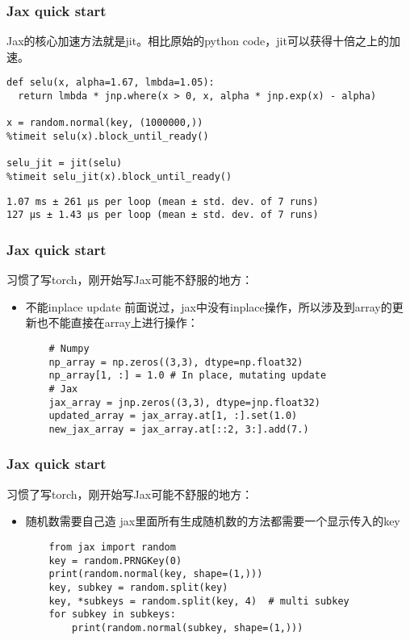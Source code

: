 \documentclass{beamer}
\begin{document}
\begin{frame}[fragile]
\frametitle{Jax quick start}

Jax的核心加速方法就是jit。相比原始的python code，jit可以获得十倍之上的加速。\newline
\begin{verbatim}
def selu(x, alpha=1.67, lmbda=1.05):
  return lmbda * jnp.where(x > 0, x, alpha * jnp.exp(x) - alpha)

x = random.normal(key, (1000000,))
%timeit selu(x).block_until_ready()

selu_jit = jit(selu)
%timeit selu_jit(x).block_until_ready()
\end{verbatim}

\begin{verbatim}
1.07 ms ± 261 µs per loop (mean ± std. dev. of 7 runs)
127 µs ± 1.43 µs per loop (mean ± std. dev. of 7 runs)
\end{verbatim}

\end{frame}

\begin{frame}[fragile]
\frametitle{Jax quick start}

习惯了写torch，刚开始写Jax可能不舒服的地方：\newline

\begin{itemize}
    \item<1-> 不能inplace update\newline
    前面说过，jax中没有inplace操作，所以涉及到array的更新也不能直接在array上进行操作：
    \begin{verbatim}
    # Numpy
    np_array = np.zeros((3,3), dtype=np.float32)
    np_array[1, :] = 1.0 # In place, mutating update
    # Jax
    jax_array = jnp.zeros((3,3), dtype=jnp.float32)
    updated_array = jax_array.at[1, :].set(1.0)
    new_jax_array = jax_array.at[::2, 3:].add(7.)
    \end{verbatim}
\end{itemize}

\end{frame}


\begin{frame}[fragile]
\frametitle{Jax quick start}

习惯了写torch，刚开始写Jax可能不舒服的地方：\newline

\begin{itemize}
    \item<1-> 随机数需要自己造\newline
    jax里面所有生成随机数的方法都需要一个显示传入的key
    \begin{verbatim}
    from jax import random
    key = random.PRNGKey(0)
    print(random.normal(key, shape=(1,)))
    key, subkey = random.split(key)
    key, *subkeys = random.split(key, 4)  # multi subkey
    for subkey in subkeys:
        print(random.normal(subkey, shape=(1,)))
    \end{verbatim}
\end{itemize}

\end{frame}
\end{document}
